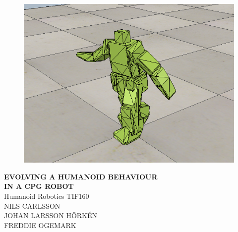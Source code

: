 
\begin{titlepage}
			
\addtolength{\voffset}{2cm}

\begin{figure}[H]
\centering
\vspace{1cm}	%
\includegraphics[width=0.9\linewidth]{include/figure/auxiliary/frontpage.png}
\end{figure}

\mbox{}
\vfill
\renewcommand{\familydefault}{\sfdefault} \normalfont %
\textbf{{\Huge EVOLVING A HUMANOID BEHAVIOUR  	\\[0.2cm] 
				IN A CPG ROBOT}} 	\\[0.5cm]
Humanoid Robotics TIF160 \setlength{\parskip}{1.0cm}\vspace{0.25cm}\\
{\large NILS CARLSSON\\ JOHAN LARSSON HÖRKÉN \\ FREDDIE OGEMARK} \setlength{\parskip}{2.9cm}

\renewcommand{\familydefault}{\rmdefault} \normalfont %
\end{titlepage}


